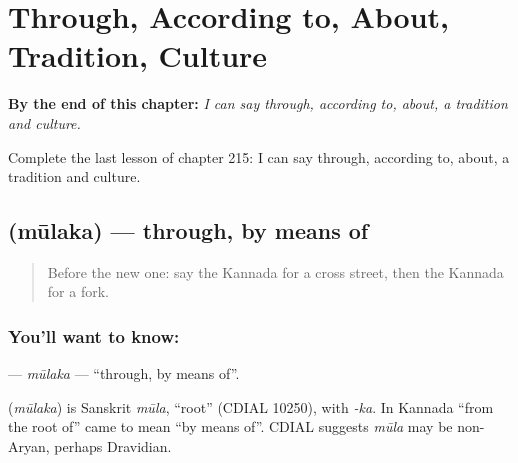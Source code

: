 
\chapter{Through, According to, About, Tradition, Culture}
\label{ch:ka-through-according-to-about-tradition-culture}

\begin{chapteropening}
\textbf{By the end of this chapter:} \emph{I can say through, according to, about, a tradition and culture.}

Complete the last lesson of chapter 215: I can say through, according to, about, a tradition and culture.
\end{chapteropening}

\section[\texorpdfstring{\kn{ಮೂಲಕ} (mūlaka)}{ಮೂಲಕ (mūlaka)}]{ (mūlaka) — through, by means of}

\label{lesson:KA-C215-mulaka}



\begin{quote}
Before the new one: say the Kannada for a cross street, then the Kannada for a fork.
\end{quote}

\subsection*{You'll want to know: }
\textbf{} — \emph{mūlaka} — \textquotedblleft{}through, by means of\textquotedblright{}.

\begin{cousinweb}
\textbf{} (\emph{mūlaka}) is Sanskrit \emph{mūla}, \textquotedblleft{}root\textquotedblright{} (CDIAL 10250), with \emph{-ka}. In Kannada \textquotedblleft{}from the root of\textquotedblright{} came to mean \textquotedblleft{}by means of\textquotedblright{}. CDIAL suggests \emph{mūla} may be non-Aryan, perhaps Dravidian.
\end{cousinweb}

